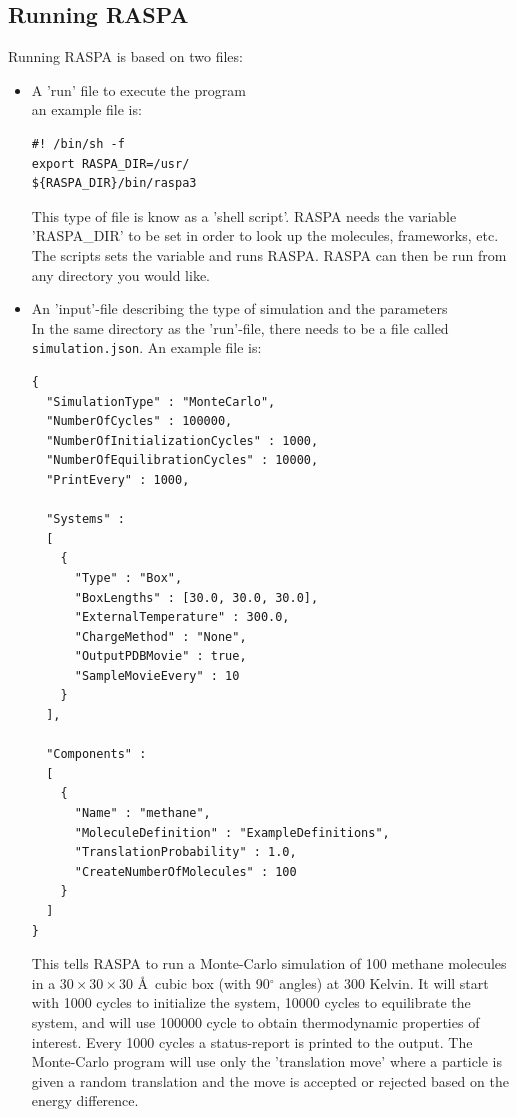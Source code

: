\subsection{Running RASPA\label{Introduction: running RASPA}}
Running RASPA is based on two files:
\begin{itemize}
 \item{A 'run' file to execute the program}\\
  an example file is:
\begin{verbatim}
#! /bin/sh -f
export RASPA_DIR=/usr/
${RASPA_DIR}/bin/raspa3
\end{verbatim}
  This type of file is know as a 'shell script'. RASPA needs the variable 'RASPA\_DIR' to be set in order
  to look up the molecules, frameworks, etc. The scripts sets the variable and runs RASPA. RASPA can then be run
  from any directory you would like.
 \item{An 'input'-file describing the type of simulation and the parameters}\\
  In the same directory as the 'run'-file, there needs to be a file called \verb+simulation.json+. An example file is:
\begin{verbatim}
{
  "SimulationType" : "MonteCarlo",
  "NumberOfCycles" : 100000,
  "NumberOfInitializationCycles" : 1000,
  "NumberOfEquilibrationCycles" : 10000,
  "PrintEvery" : 1000,

  "Systems" :
  [
    {
      "Type" : "Box",
      "BoxLengths" : [30.0, 30.0, 30.0],
      "ExternalTemperature" : 300.0,
      "ChargeMethod" : "None",
      "OutputPDBMovie" : true,
      "SampleMovieEvery" : 10
    }
  ],

  "Components" :
  [
    {
      "Name" : "methane",
      "MoleculeDefinition" : "ExampleDefinitions",
      "TranslationProbability" : 1.0,
      "CreateNumberOfMolecules" : 100
    }
  ]
}
\end{verbatim}
  This tells RASPA to run a Monte-Carlo simulation of 100 methane molecules in a $30\times30\times30$ \AA\ cubic box (with 90$^\circ$ angles)
  at 300 Kelvin. It will start with 1000 cycles to initialize the system,
    10000 cycles to equilibrate the system, and will use 100000 cycle to obtain thermodynamic properties
  of interest. Every 1000 cycles a status-report is printed to the output. The Monte-Carlo program will use only the 'translation move'
  where a particle is given a random translation and the move is accepted or rejected based on the energy difference.
  \end{itemize}


